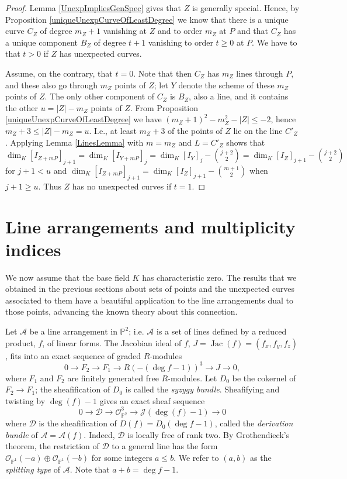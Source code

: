 \documentclass[12pt]{amsart}
\numberwithin{equation}{section}
\theoremstyle{definition}
\begin{document}
\begin{proof}
Lemma \ref{UnexpImpliesGenSpec} gives that $Z$ is generally special. Hence, 
by Proposition \ref{uniqueUnexpCurveOfLeastDegree} we know that there is a unique curve $C_Z$ of degree $m_Z + 1$ vanishing at $Z$ and to order $m_Z$ at $P$ and that $C_Z$ has a unique component $B_Z$ of degree $t+1$ vanishing to order $t \ge 0$ at $P$. We have to  that $t>0$ if $Z$ has unexpected curves.  

Assume, on the contrary, that $t=0$.
Note that then $C_Z$ has $m_Z$ lines through $P$, and these also go through $m_Z$ points of $Z$;
let $Y$ denote the scheme of these $m_Z$ points of $Z$.
The only other component of $C_Z$ is $B_Z$, also a line, and it contains the other $u=|Z|-m_Z$ points of $Z$.
From Proposition \ref{uniqueUnexpCurveOfLeastDegree} we have
$(m_Z+1)^2-m_Z^2-|Z|\leq -2$, hence $m_Z+3\leq |Z| -m_Z=u$. I.e., at least
$m_Z+3$ of the points of $Z$ lie on the line $C'_Z$.
Applying Lemma \ref{LinesLemma} with $m=m_Z$ and $L=C'_Z$ shows that
$\dim_K [I_{Z+mP}]_{j+1}=\dim_K [I_{Y+mP}]_j=\dim_K [I_Y]_j-\binom{j+2}{2}=\dim_K [I_Z]_{j+1}-\binom{j+2}{2}$
for $j+1<u$ and
$\dim_K [I_{Z+mP}]_{j+1}=\dim_K [I_Z]_{j+1}-\binom{m+1}{2}$ when $j+1\geq u$.
Thus $Z$ has no unexpected curves if $t=1$.
\end{proof}

\section{Line arrangements and multiplicity indices}  \label{arrangement section}

We now assume that the base field $K$ has characteristic zero. The results that we obtained in the previous sections about  sets of points and the unexpected curves associated to them have a beautiful application to the line arrangements dual to those points, advancing the known theory about this connection.

Let ${\mathcal{A}}$ be a line arrangement in ${ \ensuremath{\mathbb{P}}}^2$; i.e. ${\mathcal{A}}$ is a set of lines defined by a reduced product, $f$,
of linear forms. The Jacobian ideal of $f$, $J = \operatorname{Jac}(f) = (f_x, f_y, f_z)$, fits into an exact sequence of graded $R$-modules 
\[
0 \rightarrow F_2 \rightarrow F_1\rightarrow R(-(\deg f -1))^3 \rightarrow J \rightarrow 0, 
\]
where $F_1$ and $F_2$ are finitely generated free $R$-modules.  Let $D_0$ be the cokernel of $F_2 \rightarrow F_1$; the sheafification of $D_0$ is called the {\em syzygy bundle}. 
Sheafifying and twisting by $\deg(f)-1$ gives an exact sheaf sequence
\[
0 \rightarrow \mathcal D \rightarrow \mathcal O_{{ \ensuremath{\mathbb{P}}}^2}^3 \rightarrow \mathcal J(\deg(f)-1) \rightarrow 0
\]
where $\mathcal D$ is the sheafification of  $D(f) = D_0(\deg f-1)$, called the {\em derivation bundle} of ${\mathcal{A}} = {\mathcal{A}} (f)$.
Indeed,  $\mathcal D$ is locally free  of rank two. 
By Grothendieck's theorem, the restriction of $\mathcal D$ to a general line has the form 
$\mathcal O_{\mathbb P^1}(-a) \oplus \mathcal O_{\mathbb P^1}(-b)$ for some integers $a\leq b$.
We refer to $(a,b)$ as the \emph{splitting type} of ${\mathcal{A}}$. Note that $a + b = \deg f  - 1$. 
\end{document}

